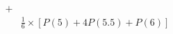\documentclass[preview]{standalone}
\begin{document}
\begin{align*}
+&\\&\frac{1}{6}\times[P(5)+4P(5.5)+P(6)]
\end{align*}
\end{document}
